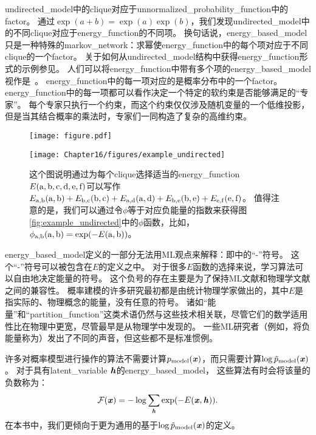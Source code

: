 \gls{undirected_model}中的\gls{clique}对应于\gls{unnormalized_probability_function}中的\gls{factor}。 
通过$\exp(a+b) = \exp(a) \exp(b)$，我们发现\gls{undirected_model}中的不同\gls{clique}对应于\gls{energy_function}的不同项。
换句话说，\gls{energy_based_model}只是一种特殊的\gls{markov_network}：求幂使\gls{energy_function}中的每个项对应于不同\gls{clique}的一个\gls{factor}。
关于如何从\gls{undirected_model}结构中获得\gls{energy_function}形式的示例参见。
人们可以将\gls{energy_function}中带有多个项的\gls{energy_based_model}视作是~\citep{Hinton99}。
\gls{energy_function}中的每一项对应的是概率分布中的一个\gls{factor}。
\gls{energy_function}中的每一项都可以看作决定一个特定的软约束是否能够满足的``专家''。
每个专家只执行一个约束，而这个约束仅仅涉及随机变量的一个低维投影，但是当其结合概率的乘法时，专家们一同构造了复杂的高维约束。



\begin{figure}[!htb]
\ifOpenSource
\centerline{\texttt{[image: figure.pdf]}}
\else
	\centerline{\texttt{[image: Chapter16/figures/example\_undirected]}}
\fi
\caption{这个图说明通过为每个\gls{clique}选择适当的\gls{energy_function} $E(\mathrm{a},\mathrm{b},\mathrm{c},\mathrm{d},\mathrm{e},\mathrm{f})$可以写作$E_{\mathrm{a},\mathrm{b}}(\mathrm{a},\mathrm{b}) + E_{\mathrm{b},\mathrm{c}}(\mathrm{b},\mathrm{c}) + E_{\mathrm{a},\mathrm{d}}(\mathrm{a},\mathrm{d})+  E_{\mathrm{b},\mathrm{e}}(\mathrm{b},\mathrm{e}) + E_{\mathrm{e},\mathrm{f}}(\mathrm{e},\mathrm{f})$。
值得注意的是，我们可以通过令$\phi$等于对应负能量的指数来获得图\ref{fig:example_undirected}中的$\phi$函数，比如，$\phi_{\mathrm{a},\mathrm{b}}(\mathrm{a},\mathrm{b}) = \exp(-E(\mathrm{a},\mathrm{b}))$。}
	\label{fig:example_undirected_2}
\end{figure}


\gls{energy_based_model}定义的一部分无法用\gls{ML}观点来解释：即中的``-''符号。
这个``-''符号可以被包含在$E$的定义之中。
对于很多$E$函数的选择来说，学习算法可以自由地决定能量的符号。
这个负号的存在主要是为了保持\gls{ML}文献和物理学文献之间的兼容性。
概率建模的许多研究最初都是由统计物理学家做出的，其中$E$是指实际的、物理概念的能量，没有任意的符号。
诸如``能量''和``\gls{partition_function}''这类术语仍然与这些技术相关联，尽管它们的数学适用性比在物理中更宽，尽管最早是从物理学中发现的。
一些\gls{ML}研究者（例如，\citet{Smolensky86}将负能量称为）发出了不同的声音，但这些都不是标准惯例。


许多对概率模型进行操作的算法不需要计算$p_{\text{model}}(\boldsymbol{\mathit{x}})$，而只需要计算$\log \tilde{p}_{\text{model}}(\boldsymbol{\mathit{x}})$。
对于具有\gls{latent_variable} $\boldsymbol{\mathit{h}}$的\gls{energy_based_model}， 这些算法有时会将该量的负数称为：
\begin{align}
\label{eqn:168}
\mathcal{F} (\boldsymbol{\mathit{x}}) = -\log \sum_{\boldsymbol{\mathit{h}}} \exp(-E(\boldsymbol{\mathit{x}},\boldsymbol{\mathit{h}})).
\end{align}
在本书中，我们更倾向于更为通用的基于$\log \tilde{p}_{\text{model}}(\boldsymbol{\mathit{x}})$的定义。


